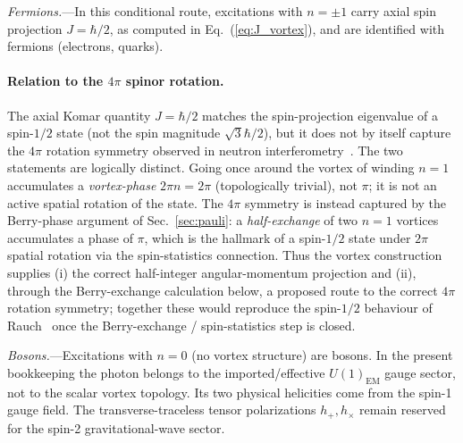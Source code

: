 \documentclass[aps,prd,onecolumn,superscriptaddress,nofootinbib,showpacs,12pt,notitlepage]{revtex4-2}
\begin{document}
\textit{Fermions.}---In this conditional route, excitations
with $n = \pm 1$ carry axial spin projection
$J = \hbar/2$, as computed in
Eq.~(\ref{eq:J_vortex}), and are identified with
fermions (electrons, quarks).

\paragraph{Relation to the $4\pi$ spinor rotation.}
The axial Komar quantity $J = \hbar/2$ matches the
spin-projection eigenvalue of a spin-$1/2$ state
(not the spin magnitude $\sqrt{3}\hbar/2$), but it does not by
itself capture the $4\pi$ rotation symmetry observed in
neutron interferometry~\cite{Rauch1975}.  The two
statements are logically distinct.  Going once around
the vortex of winding $n = 1$ accumulates a
\emph{vortex-phase} $2\pi n = 2\pi$ (topologically
trivial), not $\pi$; it is not an active spatial rotation
of the state.  The $4\pi$ symmetry is instead captured by
the Berry-phase argument of Sec.~\ref{sec:pauli}: a
\emph{half-exchange} of two $n=1$ vortices accumulates a
phase of $\pi$, which is the hallmark of a spin-$1/2$
state under $2\pi$ spatial rotation via the
spin-statistics connection.  Thus the vortex construction
supplies (i) the correct half-integer angular-momentum
projection and (ii), through the Berry-exchange
calculation below, a proposed route to the correct
$4\pi$ rotation symmetry; together these would reproduce
the spin-$1/2$ behaviour of Rauch~\cite{Rauch1975} once
the Berry-exchange / spin-statistics step is closed.

\textit{Bosons.}---Excitations with $n = 0$ (no vortex
structure) are bosons.  In the present bookkeeping the
photon belongs to the imported/effective
$U(1)_{\mathrm{EM}}$ gauge sector, not to the scalar
vortex topology.  Its two physical helicities come from
the spin-1 gauge field.  The transverse-traceless tensor
polarizations $h_{+},h_{\times}$ remain reserved for the
spin-2 gravitational-wave sector.
\end{document}
